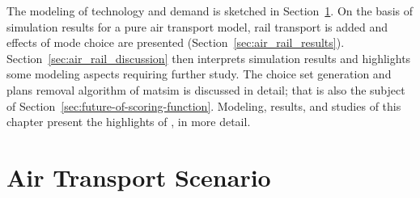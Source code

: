 The modeling of technology and demand is sketched in Section~\ref{sec:air_rail_scenario}. 
On the basis of simulation results for a pure air transport model, rail transport is added and effects of mode choice are presented (Section~\ref{sec:air_rail_results}). 
Section~\ref{sec:air_rail_discussion} then interprets simulation results and highlights some modeling aspects requiring further study. 
The choice set generation and plans removal algorithm of \gls{matsim} is discussed in detail; that is also the subject of Section~\ref{sec:future-of-scoring-function}. 
Modeling, results, and studies of this chapter present the highlights of \citet[][Chapter~6, pp.~119]{Grether_PhDThesis_2014}, in more detail.   

\section{Air Transport Scenario}
\label{sec:air_rail_scenario}
